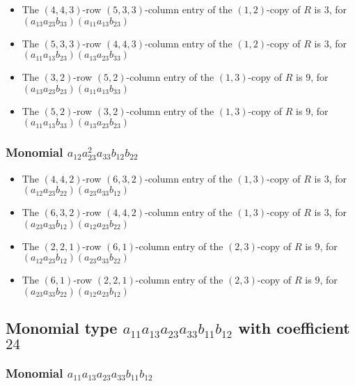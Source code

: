 \documentclass{article}
\begin{document}
\begin{itemize}
\item The $(4, 4, 3)$-row $(5, 3, 3)$-column entry of the $ \left(1, 2\right) $-copy of $R$ is $ 3 $, for $( a_{13} a_{23} b_{33} )( a_{11} a_{13} b_{23} )$ 
\item The $(5, 3, 3)$-row $(4, 4, 3)$-column entry of the $ \left(1, 2\right) $-copy of $R$ is $ 3 $, for $( a_{11} a_{13} b_{23} )( a_{13} a_{23} b_{33} )$ 
\item The $(3, 2)$-row $(5, 2)$-column entry of the $ \left(1, 3\right) $-copy of $R$ is $ 9 $, for $( a_{13} a_{23} b_{23} )( a_{11} a_{13} b_{33} )$ 
\item The $(5, 2)$-row $(3, 2)$-column entry of the $ \left(1, 3\right) $-copy of $R$ is $ 9 $, for $( a_{11} a_{13} b_{33} )( a_{13} a_{23} b_{23} )$ 
\end{itemize}
\subsubsection{Monomial $ a_{12} a_{23}^{2} a_{33} b_{12} b_{22} $}

\begin{itemize}
\item The $(4, 4, 2)$-row $(6, 3, 2)$-column entry of the $ \left(1, 3\right) $-copy of $R$ is $ 3 $, for $( a_{12} a_{23} b_{22} )( a_{23} a_{33} b_{12} )$ 
\item The $(6, 3, 2)$-row $(4, 4, 2)$-column entry of the $ \left(1, 3\right) $-copy of $R$ is $ 3 $, for $( a_{23} a_{33} b_{12} )( a_{12} a_{23} b_{22} )$ 
\item The $(2, 2, 1)$-row $(6, 1)$-column entry of the $ \left(2, 3\right) $-copy of $R$ is $ 9 $, for $( a_{12} a_{23} b_{12} )( a_{23} a_{33} b_{22} )$ 
\item The $(6, 1)$-row $(2, 2, 1)$-column entry of the $ \left(2, 3\right) $-copy of $R$ is $ 9 $, for $( a_{23} a_{33} b_{22} )( a_{12} a_{23} b_{12} )$ 
\end{itemize}
\subsection{Monomial type $ a_{11} a_{13} a_{23} a_{33} b_{11} b_{12} $ with coefficient $ 24 $}

\subsubsection{Monomial $ a_{11} a_{13} a_{23} a_{33} b_{11} b_{12} $}
\end{document}
